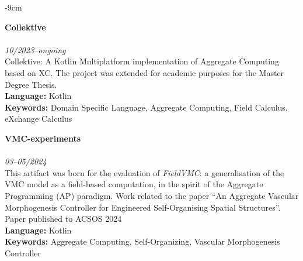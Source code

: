 \documentclass[10pt,a4paper]{altacv}
\begin{document}
\begin{adjustwidth}{}{-9cm}

    \textbf{Collektive}\\
    \\
    \textit{10/2023--ongoing}\\ \smallskip
    Collektive: A Kotlin Multiplatform implementation of Aggregate Computing based on XC. The project was extended for academic purposes for the Master Degree Thesis.\\ \smallskip
    \smallskip
    \textbf{Language:} Kotlin\\
    \textbf{Keywords:} Domain Specific Language, Aggregate Computing, Field Calculus, eXchange Calculus

%

    \divider

    \textbf{VMC-experiments}\\
    \\
    \textit{03--05/2024}\\ \smallskip
    This artifact was born for the evaluation of \emph{FieldVMC}: a generalisation of the VMC model as a field-based computation, 
    in the spirit of the Aggregate Programming (AP) paradigm.
    Work related to the paper ``An Aggregate Vascular Morphogenesis Controller for Engineered Self-Organising Spatial Structures''.\\ \smallskip
    {\small \notesymbol \hspace{0.5em} Paper published to ACSOS 2024}\\
    \smallskip
    \textbf{Language:} Kotlin\\
    \textbf{Keywords:} Aggregate Computing, Self-Organizing, Vascular Morphogenesis Controller


\end{adjustwidth}
\end{document}
